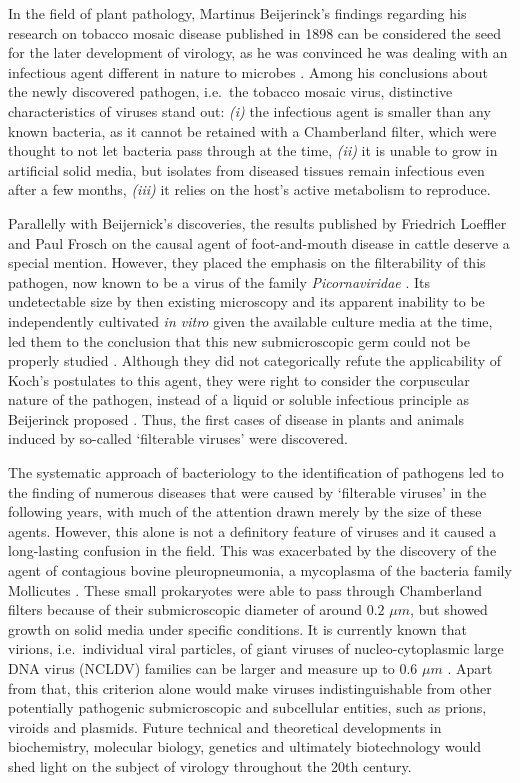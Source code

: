 \documentclass[
  openany]{book}
\begin{document}
In the field of plant pathology, Martinus Beijerinck's findings regarding his research on tobacco mosaic disease published in 1898 can be considered the seed for the later development of virology, as he was convinced he was dealing with an infectious agent different in nature to microbes \autocite{Bos1999}. Among his conclusions about the newly discovered pathogen, i.e.~the tobacco mosaic virus, distinctive characteristics of viruses stand out: \emph{(i)} the infectious agent is smaller than any known bacteria, as it cannot be retained with a Chamberland filter, which were thought to not let bacteria pass through at the time, \emph{(ii)} it is unable to grow in artificial solid media, but isolates from diseased tissues remain infectious even after a few months, \emph{(iii)} it relies on the host's active metabolism to reproduce.

Parallelly with Beijernick's discoveries, the results published by Friedrich Loeffler and Paul Frosch on the causal agent of foot-and-mouth disease in cattle deserve a special mention. However, they placed the emphasis on the filterability of this pathogen, now known to be a virus of the family \emph{Picornaviridae} \autocite{Jamal2013}. Its undetectable size by then existing microscopy and its apparent inability to be independently cultivated \emph{in vitro} given the available culture media at the time, led them to the conclusion that this new submicroscopic germ could not be properly studied \autocite{Mahy2005}. Although they did not categorically refute the applicability of Koch's postulates to this agent, they were right to consider the corpuscular nature of the pathogen, instead of a liquid or soluble infectious principle as Beijerinck proposed \autocite{Bos1999}. Thus, the first cases of disease in plants and animals induced by so-called `filterable viruses' were discovered.

The systematic approach of bacteriology to the identification of pathogens led to the finding of numerous diseases that were caused by `filterable viruses' in the following years, with much of the attention drawn merely by the size of these agents. However, this alone is not a definitory feature of viruses and it caused a long-lasting confusion in the field. This was exacerbated by the discovery of the agent of contagious bovine pleuropneumonia, a mycoplasma of the bacteria family Mollicutes \autocite{E.Nocard1990}. These small prokaryotes were able to pass through Chamberland filters because of their submicroscopic diameter of around \(0.2\) \(\mu m\), but showed growth on solid media under specific conditions. It is currently known that virions, i.e.~individual viral particles, of giant viruses of nucleo-cytoplasmic large DNA virus (NCLDV) families can be larger and measure up to \(0.6\) \(\mu m\) \autocite{Brandes2019}.
Apart from that, this criterion alone would make viruses indistinguishable from other potentially pathogenic submicroscopic and subcellular entities, such as prions, viroids and plasmids. Future technical and theoretical developments in biochemistry, molecular biology, genetics and ultimately biotechnology would shed light on the subject of virology throughout the 20th century.
\end{document}
